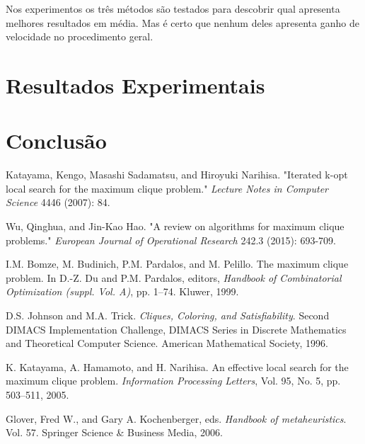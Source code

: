 \documentclass{article}
\begin{document}
Nos experimentos os três métodos são testados para descobrir qual apresenta melhores resultados em média. Mas é certo que nenhum deles apresenta ganho de velocidade no procedimento geral.

\section{Resultados Experimentais}
\section{Conclusão}


\begin{thebibliography}{58}

  Katayama, Kengo, Masashi Sadamatsu, and Hiroyuki Narihisa. 
"Iterated k-opt local search for the maximum clique problem." 
\textit{Lecture Notes in Computer Science} 4446 (2007): 84.

Wu, Qinghua, and Jin-Kao Hao. 
"A review on algorithms for maximum clique problems." 
\textit{European Journal of Operational Research} 242.3 (2015): 693-709.

I.M. Bomze, M. Budinich, P.M. Pardalos, and M. Pelillo. The maximum clique
problem. In D.-Z. Du and P.M. Pardalos, editors, \textit{Handbook of Combinatorial
Optimization (suppl. Vol. A)}, pp. 1–74. Kluwer, 1999.

D.S. Johnson and M.A. Trick. \textit{Cliques, Coloring, and Satisfiability}. Second DIMACS
Implementation Challenge, DIMACS Series in Discrete Mathematics and
Theoretical Computer Science. American Mathematical Society, 1996.

 K. Katayama, A. Hamamoto, and H. Narihisa. An effective local search for the
maximum clique problem. \textit{Information Processing Letters}, Vol. 95, No. 5, pp.
503–511, 2005.

Glover, Fred W., and Gary A. Kochenberger, eds. \textit{Handbook of metaheuristics}. Vol. 57. Springer Science \& Business Media, 2006.

\end{thebibliography}
\end{document}
